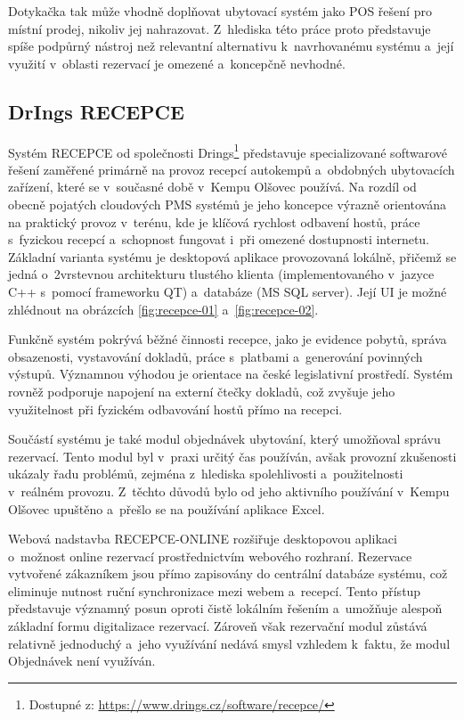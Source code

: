 Dotykačka tak může vhodně doplňovat ubytovací systém jako POS řešení pro místní prodej, nikoliv jej nahrazovat.
Z~hlediska této práce proto představuje spíše podpůrný nástroj než relevantní alternativu k~navrhovanému systému a~její využití v~oblasti rezervací je omezené a~koncepčně nevhodné.

\subsection{DrIngs RECEPCE}
Systém RECEPCE od společnosti Drings\footnote{Dostupné z: \url{https://www.drings.cz/software/recepce/}} představuje specializované softwarové řešení zaměřené primárně na provoz recepcí autokempů a~obdobných ubytovacích zařízení, které se v~současné době v~Kempu Olšovec používá.
Na rozdíl od obecně pojatých cloudových PMS systémů je jeho koncepce výrazně orientována na praktický provoz v~terénu, kde je klíčová rychlost odbavení hostů, práce s~fyzickou recepcí a~schopnost fungovat i~při omezené dostupnosti internetu.
Základní varianta systému je desktopová aplikace provozovaná lokálně, přičemž se jedná o~2vrstevnou architekturu tlustého klienta (implementovaného v~jazyce C++ s~pomocí frameworku QT) a~databáze (MS SQL server).
Její UI je možné zhlédnout na obrázcích \ref{fig:recepce-01} a~\ref{fig:recepce-02}.

Funkčně systém pokrývá běžné činnosti recepce, jako je evidence pobytů, správa obsazenosti, vystavování dokladů, práce s~platbami a~generování povinných výstupů.
Významnou výhodou je orientace na české legislativní prostředí.
Systém rovněž podporuje napojení na externí čtečky dokladů, což zvyšuje jeho využitelnost při fyzickém odbavování hostů přímo na recepci.

Součástí systému je také modul objednávek ubytování, který umožňoval správu rezervací.
Tento modul byl v~praxi určitý čas používán, avšak provozní zkušenosti ukázaly řadu problémů, zejména z~hlediska spolehlivosti a~použitelnosti v~reálném provozu.
Z~těchto důvodů bylo od jeho aktivního používání v~Kempu Olšovec upuštěno a~přešlo se na používání aplikace Excel.

Webová nadstavba RECEPCE-ONLINE rozšiřuje desktopovou aplikaci o~možnost online rezervací prostřednictvím webového rozhraní.
Rezervace vytvořené zákazníkem jsou přímo zapisovány do centrální databáze systému, což eliminuje nutnost ruční synchronizace mezi webem a~recepcí.
Tento přístup představuje významný posun oproti čistě lokálním řešením a~umožňuje alespoň základní formu digitalizace rezervací.
Zároveň však rezervační modul zůstává relativně jednoduchý a~jeho využívání nedává smysl vzhledem k~faktu, že modul Objednávek není využíván.

